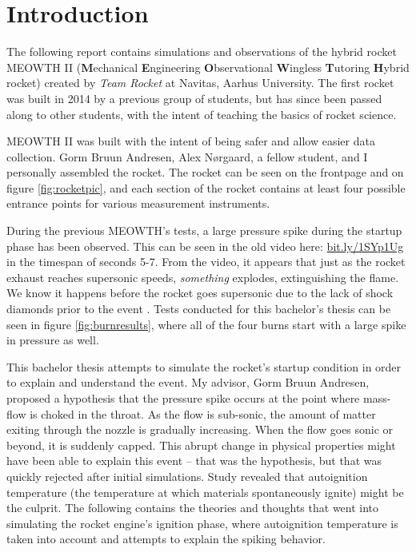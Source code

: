 \chapter{Introduction}

The following report contains simulations and observations of the hybrid rocket MEOWTH II (\textbf{M}echanical \textbf{E}ngineering \textbf{O}bservational \textbf{W}ingless \textbf{T}utoring \textbf{H}ybrid rocket) created by \emph{Team Rocket} \cite{bulba} at Navitas, Aarhus University. The first rocket was built in 2014 by a previous group of students, but has since been passed along to other students, with the intent of teaching the basics of rocket science.

MEOWTH II was built with the intent of being safer and allow easier data collection. Gorm Bruun Andresen, Alex Nørgaard, a fellow student, and I personally assembled the rocket. The rocket can be seen on the frontpage and on figure \ref{fig:rocketpic}, and each section of the rocket contains at least four possible entrance points for various measurement instruments.

During the previous MEOWTH's tests, a large pressure spike during the startup phase has been observed. This can be seen in the old video here: \url{bit.ly/1SYp1Ug} in the timespan of seconds 5-7. From the video, it appears that just as the rocket exhaust reaches supersonic speeds, \emph{something} explodes, extinguishing the flame. We know it happens before the rocket goes supersonic due to the lack of shock diamonds prior to the event \cite{rockProp}. Tests conducted for this bachelor's thesis can be seen in figure \ref{fig:burnresults}, where all of the four burns start with a large spike in pressure as well.


This bachelor thesis attempts to simulate the rocket's startup condition in order to explain and understand the event. My advisor, Gorm Bruun Andresen, proposed a hypothesis that the pressure spike occurs at the point where mass-flow is choked in the throat. As the flow is sub-sonic, the amount of matter exiting through the nozzle is gradually increasing. When the flow goes sonic or beyond, it is suddenly capped. This abrupt change in physical properties might have been able to explain this event -- that was the hypothesis, but that was quickly rejected after initial simulations. Study revealed that autoignition temperature (the temperature at which materials spontaneously ignite) might be the culprit. The following contains the theories and thoughts that went into simulating the rocket engine's ignition phase, where autoignition temperature is taken into account and attempts to explain the spiking behavior.

